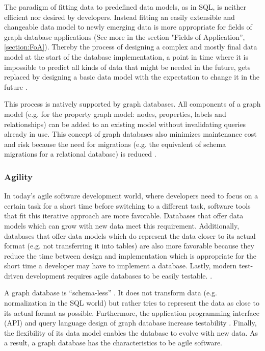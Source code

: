 The paradigm of fitting data to predefined data models, as in SQL, is neither efficient nor desired by developers. Instead fitting an easily extensible and changeable data model to newly emerging data is more appropriate for fields of graph database applications (See more in the section "Fields of Application”, \ref{section:FoA}). Thereby the process of designing a complex and mostly final data model at the start of the database implementation, a point in time where it is impossible to predict all kinds of data that might be needed in the future, gets replaced by designing a basic data model with the expectation to change it in the future \autocite{maheshlal2015, graphdb2015}.

This process is natively supported by graph databases. All components of a graph model (e.g. for the property graph model: nodes, properties, labels and relationships) can be added to an existing model without invalidating queries already in use. This concept of graph databases also minimizes maintenance cost and risk because the need for migrations (e.g. the equivalent of schema migrations for a relational database) is reduced \autocite{maheshlal2015, graphdb2015}.

\subsubsection{Agility}
In today's agile software development world, where developers need to focus on a certain task for a short time before switching to a different task, software tools that fit this iterative approach are more favorable. Databases that offer data models which can grow with new data meet this requirement. Additionally, databases that offer data models which do represent the data closer to its actual format (e.g. not transferring it into tables) are also more favorable because they reduce the time between design and implementation which is appropriate for the short time a developer may have to implement a database. Lastly, modern test-driven development requires agile databases to be easily testable. \autocite{maheshlal2015, graphdb2015}.

A graph database is “schema-less” \autocite{maheshlal2015}. It does not transform data (e.g. normalization in the SQL world) but rather tries to represent the data as close to its actual format as possible. Furthermore, the application programming interface (API) and query language design of graph database increase testability \autocite{graphdb2015} . Finally, the flexibility of its data model enables the database to evolve with new data. As a result, a graph database has the characteristics to be agile software.

